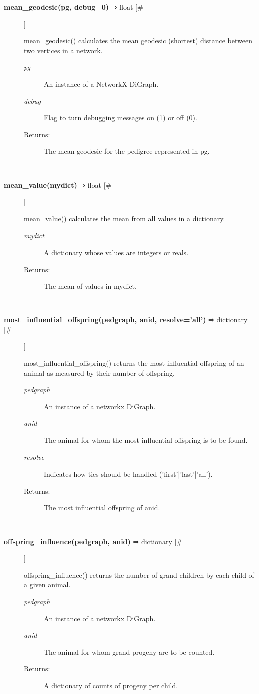 \begin{description}
\item[\textbf{mean\_geodesic(pg, debug=0)} ⇒ float [\#]
]
\par mean\_geodesic() calculates the mean geodesic (shortest) distance
between two vertices in a network.
\begin{description}
\item[\textit{pg}
]
An instance of a NetworkX DiGraph.
\item[\textit{debug}
]
Flag to turn debugging messages on (1) or off (0).
\item[Returns:
]
The mean geodesic for the pedigree represented in pg.
\end{description}\\

\item[\textbf{mean\_value(mydict)} ⇒ float [\#]
]
\par mean\_value() calculates the mean from all values in a dictionary.
\begin{description}
\item[\textit{mydict}
]
A dictionary whose values are integers or reals.
\item[Returns:
]
The mean of values in mydict.
\end{description}\\

\item[\textbf{most\_influential\_offspring(pedgraph, anid, resolve='all')} ⇒ dictionary [\#]
]
\par most\_influential\_offspring() returns the most influential offspring of an animal as measured by their number of offspring.
\begin{description}
\item[\textit{pedgraph}
]
An instance of a networkx DiGraph.
\item[\textit{anid}
]
The animal for whom the most influential offspring is to be found.
\item[\textit{resolve}
]
Indicates how ties should be handled ('first'|'last'|'all').
\item[Returns:
]
The most influential offspring of anid.
\end{description}\\

\item[\textbf{offspring\_influence(pedgraph, anid)} ⇒ dictionary [\#]
]
\par offspring\_influence() returns the number of grand-children by each child of a given animal.
\begin{description}
\item[\textit{pedgraph}
]
An instance of a networkx DiGraph.
\item[\textit{anid}
]
The animal for whom grand-progeny are to be counted.
\item[Returns:
]
A dictionary of counts of progeny per child.
\end{description}\\


\end{description}
